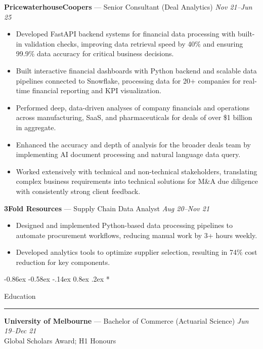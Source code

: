 \documentclass[10pt,letterpaper]{article}
\makeatletter
\renewcommand{\section}{\@startsection{section}{1}{\z@}%
  {-0.86ex \@plus -0.58ex \@minus -.14ex}%
  {0.8ex \@plus.2ex}%
  {\normalfont\large\bfseries}}
\makeatother
\begin{document}
{\bfseries PricewaterhouseCoopers} — Senior Consultant (Deal Analytics) \hfill \textit{Nov 21--Jun 25}\vspace{-0.2em}
\begin{itemize}
  \item Developed FastAPI backend systems for financial data processing with built-in validation checks, improving data retrieval speed by 40\% and ensuring 99.9\% data accuracy for critical business decisions.
  \item Built interactive financial dashboards with Python backend and scalable data pipelines connected to Snowflake, processing data for 20+ companies for real-time financial reporting and KPI visualization.
  \item Performed deep, data-driven analyses of company financials and operations across manufacturing, SaaS, and pharmaceuticals for deals of over \$1 billion in aggregate.
  \item Enhanced the accuracy and depth of analysis for the broader deals team by implementing AI document processing and natural language data query.
  \item Worked extensively with technical and non-technical stakeholders, translating complex business requirements into technical solutions for M\&A due diligence with consistently strong client feedback.
\end{itemize}

{\bfseries 3Fold Resources} — Supply Chain Data Analyst \hfill \textit{Aug 20--Nov 21}\vspace{-0.2em}
\begin{itemize}
  \item Designed and implemented Python-based data processing pipelines to automate procurement workflows, reducing manual work by 3+ hours weekly.
  \item Developed analytics tools to optimize supplier selection, resulting in 74\% cost reduction for key components.
\end{itemize}

\section*{Education\strut}
\hrule\vspace{0.2em}

{\bfseries University of Melbourne} — Bachelor of Commerce (Actuarial Science) \hfill \textit{Jun 19--Dec 21}\\
Global Scholars Award; H1 Honours
\end{document}
